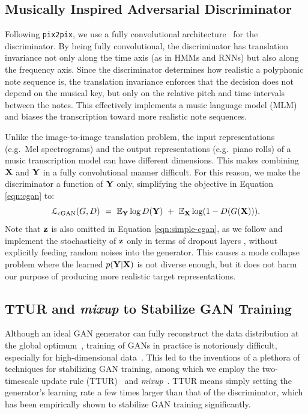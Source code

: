 \subsection{Musically Inspired Adversarial Discriminator}

Following \texttt{pix2pix}, we use a fully convolutional architecture~\cite{long2015fcn} for the discriminator.
By being fully convolutional, the discriminator has translation invariance not only along the time axis (as in HMMs and RNNs) but also along the frequency axis.
Since the discriminator determines how realistic a polyphonic note sequence is, the translation invariance enforces that the decision does not depend on the musical key, but only on the relative pitch and time intervals between the notes.
This effectively implements a music language model (MLM)~\cite{boulangerlewandowski2012temporal,sigtia2016endtoend} and biases the transcription toward more realistic note sequences.

Unlike the image-to-image translation problem, the input representations (e.g.~Mel spectrograms) and the output representations (e.g.~piano rolls) of a music transcription model can have different dimensions.
This makes combining $\mathbf{X}$ and $\mathbf{Y}$ in a fully convolutional manner difficult.
For this reason, we make the discriminator a function of $\mathbf{Y}$ only, simplifying the objective in Equation \ref{eqn:cgan} to:
\begin{equation}\label{eqn:simple-cgan}
\mathcal{L}_{\text{cGAN}}(G, D) ~ = ~  \mathbb{E}_{\mathbf{Y}}  \log D(\mathbf{Y}) ~ + ~ \mathbb{E}_{\mathbf{X}} \log (1 - D ( G(\mathbf{X}))).
\end{equation}
Note that $\mathbf{z}$ is also omitted in Equation \ref{eqn:simple-cgan}, as we follow \cite{isola2017pix2pix} and implement the stochasticity of $\mathbf{z}$ only in terms of dropout layers \cite{srivastava2014dropout}, without explicitly feeding random noises into the generator.
This causes a mode collapse problem where the learned $p(\mathbf{Y}|\mathbf{X})$ is not diverse enough, but it does not harm our purpose of producing more realistic target representations.

\subsection{TTUR and \textit{mixup} to Stabilize GAN Training}

Although an ideal GAN generator can fully reconstruct the data distribution at the global optimum~\cite{goodfellow2014gan}, training of GANs in practice is notoriously difficult, especially for high-dimensional data~\cite{goodfellow2016gan}.
This led to the inventions of a plethora of techniques for stabilizing GAN training, among which we employ the two-timescale update rule (TTUR)~\cite{heusel2017ttur} and \textit{mixup}~\cite{zhang2018mixup}.
TTUR means simply setting the generator's learning rate a few times larger than that of the discriminator, which has been empirically shown to stabilize GAN training significantly.

